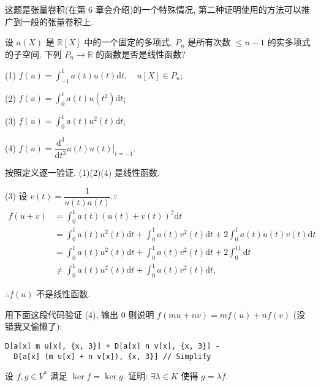 \documentclass[color=black,device=normal,lang=cn,mode=geye]{elegantnote}
\begin{document}
\begin{note}
    这题是张量卷积(在第 6 章会介绍)的一个特殊情况, 第二种证明使用的方法可以推广到一般的张量卷积上.
\end{note}
\begin{exercise}%
    设 $a(X)$ 是 $\mathbb{R}[X]$ 中的一个固定的多项式, $P_n$ 是所有次数 $\leq n-1$ 的实多项式的子空间. 下列 $P_n\to\mathbb{R}$ 的函数是否是线性函数?

    (1) $f(u)=\int_{-1}^1a(t)u(t)\mathrm{d}t,\quad u[X]\in P_n$;

    (2) $f(u)=\int_0^1a(t)u(t^2)\mathrm{d}t$;

    (3) $f(u)=\int_0^1a(t)u^2(t)\mathrm{d}t$;

    (4) $f(u)=\dfrac{\mathrm{d}^3}{\mathrm{d}t^3}a(t)u(t)\Big|_{t=-1}$.
\end{exercise}
\begin{solution}
    按照定义逐一验证. (1)(2)(4) 是线性函数.

    (3) 设 $v(t)=\dfrac{1}{u(t)a(t)}.\because$
    \begin{align*}
        f(u+v) & =\int_0^1a(t)(u(t)+v(t))^2\mathrm{d}t \\
        & =\int_0^1a(t)u^2(t)\mathrm{d}t+\int_0^1a(t)v^2(t)\mathrm{d}t+2\int_0^1a(t)u(t)v(t)\mathrm{d}t \\
        & =\int_0^1a(t)u^2(t)\mathrm{d}t+\int_0^1a(t)v^2(t)\mathrm{d}t+2\int_0^11\mathrm{d}t \\
        & \neq\int_0^1a(t)u^2(t)\mathrm{d}t+\int_0^1a(t)v^2(t)\mathrm{d}t,
    \end{align*}
    
    $\therefore f(u)$ 不是线性函数.
\end{solution}
\begin{note}
    用下面这段代码验证 (4), 输出 $0$ 则说明 $f(mu+nv)=mf(u)+nf(v)$ (没错我又偷懒了):
    \begin{lstlisting}
D[a[x] m u[x], {x, 3}] + D[a[x] n v[x], {x, 3}] - 
  D[a[x] (m u[x] + n v[x]), {x, 3}] // Simplify
    \end{lstlisting}
\end{note}
\begin{exercise}%
    设 $f,g\in V^*$ 满足 $\ker f=\ker g$. 证明: $\exists\lambda\in K$ 使得 $g=\lambda f$.
\end{exercise}
\end{document}
